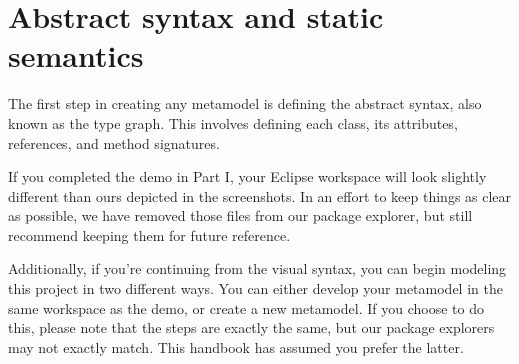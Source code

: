 \newpage
\section{Abstract syntax and static semantics}
\genHeader
\label{sec: staticSemantics}

The first step in creating any metamodel is defining the abstract syntax, also known as the type graph. This involves defining each class, its attributes,
references, and method signatures.

If you completed the demo in Part I, your Eclipse workspace will look slightly different than ours depicted in the screenshots. In an effort to keep things as
clear as possible, we have removed those files from our package explorer, but still recommend keeping them for future reference. 

Additionally, if you're continuing from the visual syntax, you can begin modeling this project in two different ways. You can either develop your metamodel in
the same workspace as the demo, or create a new metamodel. If you choose to do this, please note that the steps are exactly the same, but our package explorers
may not exactly match. This handbook has assumed you prefer the latter.












 
